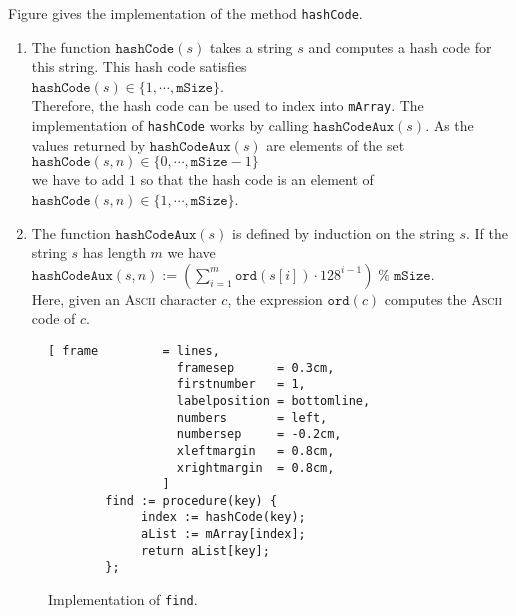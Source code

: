 Figure gives the implementation of the method \texttt{hashCode}.
\begin{enumerate}
\item The function $\texttt{hashCode}(s)$ takes a string $s$ and computes a hash code for this string.
      This hash code satisfies
      \\[0.2cm]
      \hspace*{1.3cm}
      $\mathtt{hashCode}(s) \in \{ 1, \cdots, \mathtt{mSize} \}$.
      \\[0.2cm]
      Therefore, the hash code can be used to index into \texttt{mArray}.  The implementation of
      \texttt{hashCode} works by calling $\texttt{hashCodeAux}(s)$.  As the values returned by
      $\texttt{hashCodeAux}(s)$ are elements of the set
      \\[0.2cm]
      \hspace*{1.3cm}
      $\mathtt{hashCode}(s,n) \in \{ 0, \cdots, \mathtt{mSize}-1 \}$      
      \\[0.2cm]
      we have to add $1$ so that the hash code is an element of 
      \\[0.2cm]
      \hspace*{1.3cm}
      $\mathtt{hashCode}(s,n) \in \{ 1, \cdots, \mathtt{mSize} \}$.      
\item The function $\mathtt{hashCodeAux}(s)$ is defined by induction on the string $s$.
      If the string $s$ has length $m$ we have
      \\[0.2cm]
      \hspace*{1.3cm}
      $\mathtt{hashCodeAux}(s,n) := \left(\sum\limits_{i=1}^m \mathtt{ord}(s[i]) \cdot 128^{i-1}\right) \;\mathtt{\%}\; \mathtt{mSize}$.
      \\[0.2cm]
      Here, given an \textsc{Ascii} character $c$, the expression  $\mathtt{ord}(c)$ computes the
      \textsc{Ascii} code of  $c$.
\end{enumerate}

\begin{figure}[!ht]
\centering
\begin{Verbatim}[ frame         = lines, 
                  framesep      = 0.3cm, 
                  firstnumber   = 1,
                  labelposition = bottomline,
                  numbers       = left,
                  numbersep     = -0.2cm,
                  xleftmargin   = 0.8cm,
                  xrightmargin  = 0.8cm,
                ]
        find := procedure(key) {
             index := hashCode(key);
             aList := mArray[index];
             return aList[key];
        };
\end{Verbatim}
\vspace*{-0.3cm}
\caption{Implementation of \texttt{find}.}
\label{fig:hashTable.stlx-find}
\end{figure}

